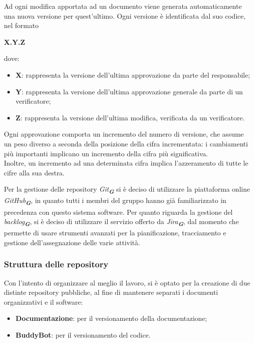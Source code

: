 Ad ogni modifica apportata ad un documento viene generata automaticamente una nuova
versione per quest’ultimo. Ogni versione è identificata dal suo codice, nel formato
\begin{center}
    \textbf{X.Y.Z}
\end{center}
dove:
\begin{itemize}
    \item \textbf{X}: rappresenta la versione dell’ultima approvazione da parte del responsabile;
    \item \textbf{Y}: rappresenta la versione dell’ultima approvazione generale da parte di un verificatore;
    \item \textbf{Z}: rappresenta la versione dell’ultima modifica, verificata da un verificatore.
\end{itemize}
Ogni approvazione comporta un incremento del numero di versione, che assume un peso
diverso a seconda della posizione della cifra incrementata: i cambiamenti più importanti
implicano un incremento della cifra più significativa.\\
Inoltre, un incremento ad una determinata cifra implica l’azzeramento di tutte le cifre alla
sua destra.

Per la gestione delle repository \emph{Git}\textsubscript{\textit{\textbf{G}}} si è deciso di utilizzare la 
piattaforma online \emph{GitHub}\textsubscript{\textit{\textbf{G}}}, in
quanto tutti i membri del gruppo hanno già familiarizzato in precedenza con questo sistema
software. Per quanto riguarda la gestione del \emph{backlog}\textsubscript{\textit{\textbf{G}}}, si è deciso di utilizzare
il servizio offerto da \emph{Jira}\textsubscript{\textit{\textbf{G}}}, dal momento che permette di usare strumenti avanzati per la
pianificazione, tracciamento e gestione dell’assegnazione delle varie attività.


\subsubsection{Struttura delle repository}
Con l’intento di organizzare al meglio il lavoro, si è optato per la creazione di due distinte 
repository pubbliche, al fine di mantenere separati i documenti organizzativi e il software:
\begin{itemize}
    \item \textbf{Documentazione}: per il versionamento della documentazione;
    \item \textbf{BuddyBot}: per il versionamento del codice.
\end{itemize}

